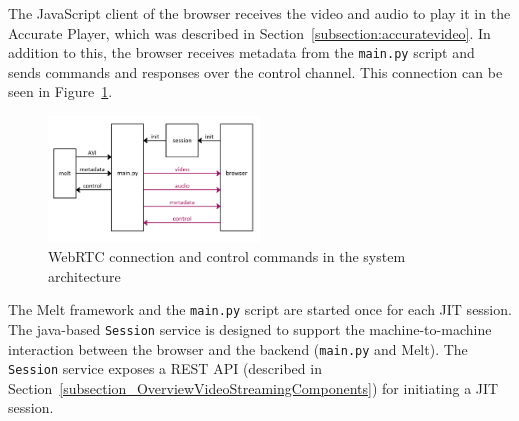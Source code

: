 \documentclass[../MasterThesis.tex]{subfiles}
\begin{document}
The JavaScript client of the browser receives the video and audio to play it in the Accurate Player, which was described in Section~\ref{subsection:accuratevideo}. In addition to this, the browser
receives metadata from the \texttt{main.py} script and sends commands and responses over the control channel. This connection can be seen in Figure~\ref{figure:videoaudio}.


\begin{figure}[H]
	\centering
	\includegraphics[width=0.5\textwidth]{IM_wrtc_control.png}
	\caption[WebRTC and control in the system architecture]{WebRTC connection and control commands in the system architecture}
	\label{figure:videoaudio}
\end{figure}

The Melt framework and the \texttt{main.py} script are started once for each JIT session.
The java-based \texttt{Session} service is designed to support the machine-to-machine interaction between the browser and the backend (\texttt{main.py} and Melt). 
The \texttt{Session} service exposes a REST API (described in Section~\ref{subsection_OverviewVideoStreamingComponents}) for initiating a JIT session. 
%
%
%
%
%
%
%
%
\end{document}
